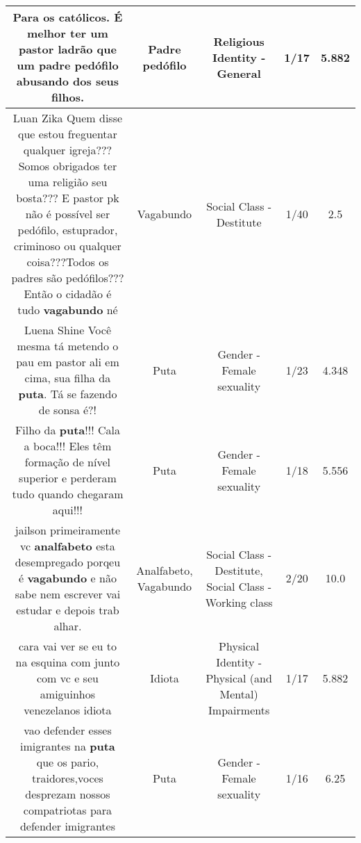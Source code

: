 \documentclass[11pt]{article}
\newlength\mylength
\begin{document}
\begin{center}
\begin{longtable}{|C{.65\mylength}|C{.30\mylength}|C{.12\mylength}|C{.12\mylength}|C{.12\mylength}|}
  \small Para os católicos. É melhor ter um pastor ladrão que um \textbf{padre pedófilo} abusando dos seus filhos.\normalsize   & Padre pedófilo & Religious Identity - General & 1/17 & 5.882 \\  \hline
  \small Luan Zika Quem disse que estou freguentar qualquer igreja??? Somos obrigados ter uma religião seu bosta??? E pastor pk não é possível ser pedófilo, estuprador, criminoso ou qualquer coisa???Todos os padres são pedófilos??? Então o cidadão é tudo \textbf{vagabundo} né\normalsize   & Vagabundo & Social Class - Destitute & 1/40 & 2.5 \\  \hline
  \small Luena Shine Você mesma tá metendo o pau em pastor ali em cima, sua filha da \textbf{puta}. Tá se fazendo de sonsa é?!\normalsize   & Puta & Gender - Female sexuality & 1/23 & 4.348 \\  \hline
  \small Filho da \textbf{puta}!!! Cala a boca!!! Eles têm formação de nível superior e perderam tudo quando chegaram aqui!!!\normalsize   & Puta & Gender - Female sexuality & 1/18 & 5.556 \\  \hline
  \small jailson primeiramente vc \textbf{analfabeto} esta desempregado porqeu é \textbf{vagabundo} e não sabe nem escrever vai estudar e depois trab alhar.\normalsize   & Analfabeto, Vagabundo & Social Class - Destitute, Social Class - Working class & 2/20 & 10.0 \\  \hline
  \small cara vai ver se eu to na esquina com junto com vc e seu amiguinhos venezelanos idiota\normalsize   & Idiota & Physical Identity - Physical (and Mental) Impairments & 1/17 & 5.882 \\  \hline
  \small vao defender esses imigrantes na \textbf{puta} que os pario, traidores,voces desprezam nossos compatriotas para defender imigrantes\normalsize   & Puta & Gender - Female sexuality & 1/16 & 6.25 \\  \hline

\end{longtable}
\end{center}
\end{document}
